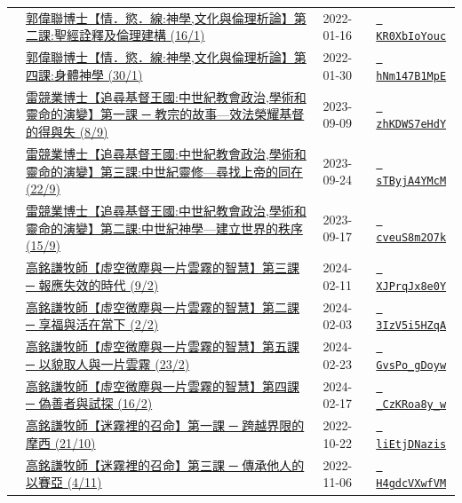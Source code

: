 \documentclass{book}
\begin{document}
{\begin{xltabular}{\textwidth}{|p{0.15\textwidth} p{0.6\textwidth}|p{0.07\textwidth} p{0.1\textwidth}|}
    & \hyperref[sec:KR0XbIoYouc]{郭偉聯博士【情．慾．線:神學,文化與倫理析論】第二課:聖經詮釋及倫理建構 (16/1)} & 2022-01-16 & \href{https://youtube.com/watch?v=KR0XbIoYouc}{\texttt{ KR0XbIoYouc}} \\
    & \hyperref[sec:hNm147B1MpE]{郭偉聯博士【情．慾．線:神學,文化與倫理析論】第四課:身體神學 (30/1)} & 2022-01-30 & \href{https://youtube.com/watch?v=hNm147B1MpE}{\texttt{ hNm147B1MpE}} \\
    & \hyperref[sec:zhKDWS7eHdY]{雷競業博士【追尋基督王國:中世紀教會政治,學術和靈命的演變】第一課 ─ 教宗的故事—效法榮耀基督的得與失 (8/9)} & 2023-09-09 & \href{https://youtube.com/watch?v=zhKDWS7eHdY}{\texttt{ zhKDWS7eHdY}} \\
    & \hyperref[sec:sTByjA4YMcM]{雷競業博士【追尋基督王國:中世紀教會政治,學術和靈命的演變】第三課:中世紀靈修—尋找上帝的同在 (22/9)} & 2023-09-24 & \href{https://youtube.com/watch?v=sTByjA4YMcM}{\texttt{ sTByjA4YMcM}} \\
    & \hyperref[sec:cveuS8m2O7k]{雷競業博士【追尋基督王國:中世紀教會政治,學術和靈命的演變】第二課:中世紀神學—建立世界的秩序 (15/9)} & 2023-09-17 & \href{https://youtube.com/watch?v=cveuS8m2O7k}{\texttt{ cveuS8m2O7k}} \\
    & \hyperref[sec:XJPrqJx8e0Y]{高銘謙牧師【虛空微塵與一片雲霧的智慧】第三課 ─ 報應失效的時代 (9/2)} & 2024-02-11 & \href{https://youtube.com/watch?v=XJPrqJx8e0Y}{\texttt{ XJPrqJx8e0Y}} \\
    & \hyperref[sec:3IzV5i5HZqA]{高銘謙牧師【虛空微塵與一片雲霧的智慧】第二課 ─ 享福與活在當下 (2/2)} & 2024-02-03 & \href{https://youtube.com/watch?v=3IzV5i5HZqA}{\texttt{ 3IzV5i5HZqA}} \\
    & \hyperref[sec:GvsPo_gDoyw]{高銘謙牧師【虛空微塵與一片雲霧的智慧】第五課 ─ 以貌取人與一片雲霧 (23/2)} & 2024-02-23 & \href{https://youtube.com/watch?v=GvsPo_gDoyw}{\texttt{ GvsPo\_gDoyw}} \\
    & \hyperref[sec:_CzKRoa8y_w]{高銘謙牧師【虛空微塵與一片雲霧的智慧】第四課 ─ 偽善者與試探 (16/2)} & 2024-02-17 & \href{https://youtube.com/watch?v=_CzKRoa8y_w}{\texttt{ \_CzKRoa8y\_w}} \\
    & \hyperref[sec:liEtjDNazis]{高銘謙牧師【迷霧裡的召命】第一課 ─ 跨越界限的摩西 (21/10)} & 2022-10-22 & \href{https://youtube.com/watch?v=liEtjDNazis}{\texttt{ liEtjDNazis}} \\
    & \hyperref[sec:H4gdcVXwfVM]{高銘謙牧師【迷霧裡的召命】第三課 ─ 傳承他人的以賽亞 (4/11)} & 2022-11-06 & \href{https://youtube.com/watch?v=H4gdcVXwfVM}{\texttt{ H4gdcVXwfVM}} \\

\end{xltabular}}
\end{document}

